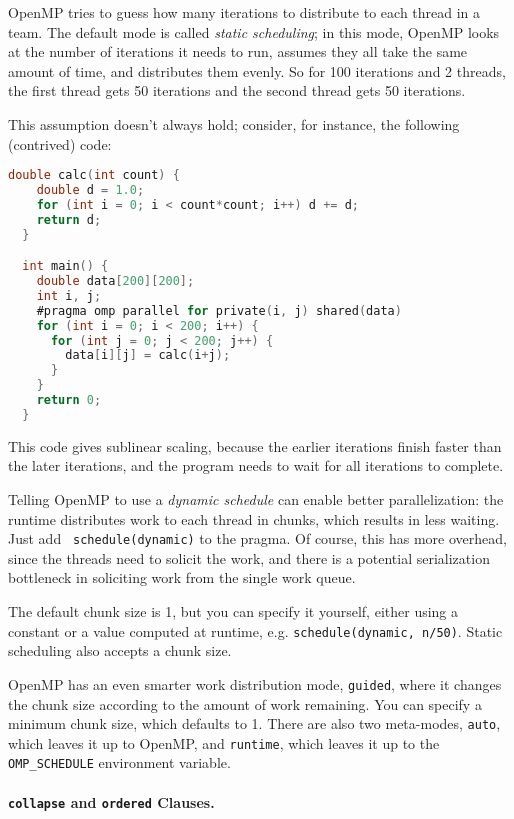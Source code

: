 OpenMP tries to guess how many iterations to distribute to each thread
in a team. The default mode is called \emph{static scheduling}; in
this mode, OpenMP looks at the number of iterations it needs to run,
assumes they all take the same amount of time, and distributes them
evenly. So for 100 iterations and 2 threads, the first thread gets 50
iterations and the second thread gets 50 iterations.

This assumption doesn't always hold; consider, for instance, the 
following (contrived) code:
{\small
\begin{lstlisting}[language=C,morekeywords={foreach,pragma,omp,parallel,single,nowait,task,untied,barrier,taskyield}]
  double calc(int count) {
    double d = 1.0;
    for (int i = 0; i < count*count; i++) d += d;
    return d;
  }

  int main() {
    double data[200][200];
    int i, j;
    #pragma omp parallel for private(i, j) shared(data)
    for (int i = 0; i < 200; i++) {
      for (int j = 0; j < 200; j++) {
        data[i][j] = calc(i+j);
      }
    }
    return 0;
  }
\end{lstlisting}
}
This code gives sublinear scaling, because the earlier iterations 
finish faster than the later iterations, and the program needs to wait
for all iterations to complete.

Telling OpenMP to use a \emph{dynamic schedule} can enable better
parallelization: the runtime distributes work to each thread in
chunks, which results in less waiting. Just add {\tt
  schedule(dynamic)} to the pragma. Of course, this has more overhead,
since the threads need to solicit the work, and there is a potential
serialization bottleneck in soliciting work from the single work
queue. 

The default chunk size is 1, but you can specify it yourself, either
using a constant or a value computed at runtime, e.g. 
{\tt schedule(dynamic, n/50)}. Static scheduling also accepts a
chunk size.

OpenMP has an even smarter work distribution mode, {\tt guided}, where
it changes the chunk size according to the amount of work remaining.
You can specify a minimum chunk size, which defaults to 1. There
are also two meta-modes, {\tt auto}, which leaves it up to OpenMP, and
{\tt runtime}, which leaves it up to the \verb+OMP_SCHEDULE+ environment
variable.



\paragraph{{\tt collapse} and {\tt ordered} Clauses.}

